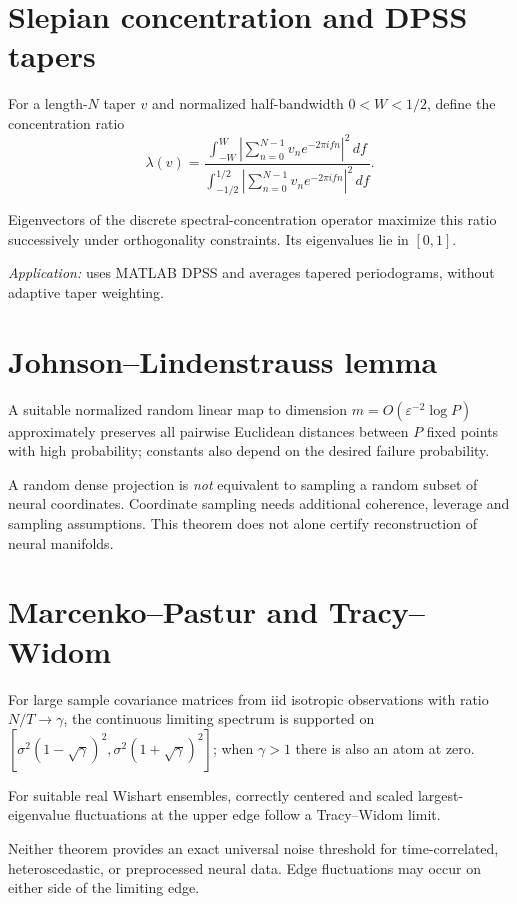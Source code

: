 \section{Slepian concentration and DPSS tapers}
For a length-$N$ taper $v$ and normalized half-bandwidth $0<W<1/2$,
define the concentration ratio
\[
\lambda(v)=
\frac{\int_{-W}^W|\sum_{n=0}^{N-1}v_ne^{-2\pi ifn}|^2\,df}
{\int_{-1/2}^{1/2}|\sum_{n=0}^{N-1}v_ne^{-2\pi ifn}|^2\,df}.
\]
\begin{theorem}
Eigenvectors of the discrete spectral-concentration operator
maximize this ratio successively under orthogonality constraints.
Its eigenvalues lie in $[0,1]$.
\end{theorem}
\emph{Application:} \texttt{}
uses MATLAB DPSS and averages tapered periodograms, without
adaptive taper weighting.

\section{Johnson--Lindenstrauss lemma}
\begin{theorem}
A suitable normalized random linear map to dimension
$m=O(\varepsilon^{-2}\log P)$ approximately preserves all
pairwise Euclidean distances between $P$ fixed points with high
probability; constants also depend on the desired failure probability.
\end{theorem}
A random dense projection is \emph{not} equivalent to sampling a random
subset of neural coordinates. Coordinate sampling needs additional
coherence, leverage and sampling assumptions. This theorem does not
alone certify reconstruction of neural manifolds.

\section{Marcenko--Pastur and Tracy--Widom}
\begin{theorem}
For large sample covariance matrices from iid isotropic
observations with ratio $N/T\to\gamma$, the continuous
limiting spectrum is supported on
$[\sigma^2(1-\sqrt\gamma)^2,\sigma^2(1+\sqrt\gamma)^2]$;
when $\gamma>1$ there is also an atom at zero.
\end{theorem}
\begin{theorem}
For suitable real Wishart ensembles, correctly centered and scaled
largest-eigenvalue fluctuations at the upper edge follow a
Tracy--Widom limit.
\end{theorem}
Neither theorem provides an exact universal noise threshold
for time-correlated, heteroscedastic, or preprocessed neural data.
Edge fluctuations may occur on either side of the limiting edge.

